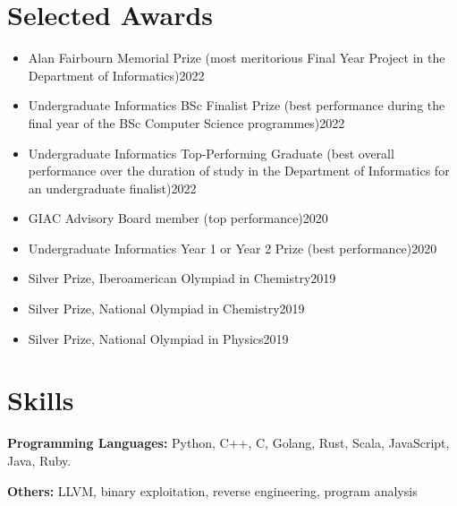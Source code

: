 \documentclass{resume}
\begin{document}
\section{Selected Awards}
\begin{itemize}
    \item Alan Fairbourn Memorial Prize (most meritorious Final Year Project in the
    Department of Informatics)\hfill 2022
    \item Undergraduate Informatics BSc Finalist Prize (best performance during the final year of the BSc Computer Science programmes)\hfill 2022
    \item Undergraduate Informatics Top-Performing Graduate (best overall performance over the duration of study in the
    Department of Informatics for an undergraduate finalist)\hfill 2022
    \item GIAC Advisory Board member (top performance)\hfill 2020
    \item Undergraduate Informatics Year 1 or Year 2 Prize (best performance)\hfill 2020
    \item Silver Prize, Iberoamerican Olympiad in Chemistry\hfill 2019
    \item Silver Prize, National Olympiad in Chemistry\hfill 2019
    \item Silver Prize, National Olympiad in Physics\hfill 2019
\end{itemize}




\section{Skills}
\textbf{Programming Languages:} \small Python, C++, C, Golang, Rust, Scala, JavaScript, Java, Ruby.

\textbf{Others:} \small LLVM, binary exploitation, reverse engineering, program analysis
\end{document}
